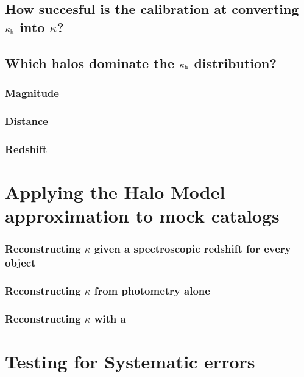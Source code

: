 \documentclass[useAMS,usenatbib]{mn2e}
\begin{document}
\subsection{How succesful is the calibration at converting $\kappa_{\rm h}$ into $\kappa$?}

\subsection{Which halos dominate the $\kappa_{\rm h}$ distribution?}
\subsubsection{Magnitude}
\subsubsection{Distance}
\subsubsection{Redshift}



\section{Applying the Halo Model approximation to mock catalogs}
\label{sec:obsMstar+z}

\subsubsection{Reconstructing $\kappa$ given a spectroscopic redshift for every object}

\subsubsection{Reconstructing $\kappa$ from photometry alone}

\subsubsection{Reconstructing $\kappa$ with a }




\section{Testing for Systematic errors}
\end{document}
